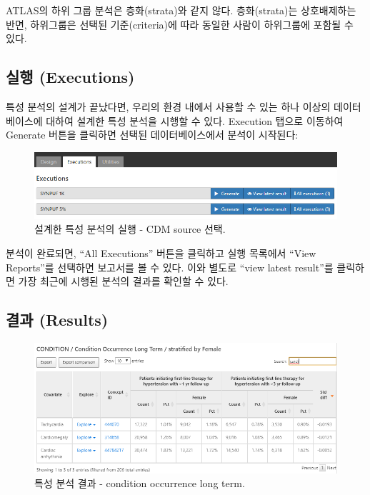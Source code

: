 \documentclass[11pt]{book}
\theoremstyle{definition}
\theoremstyle{definition}
\theoremstyle{definition}
\theoremstyle{remark}
\let\BeginKnitrBlock\begin \let\EndKnitrBlock\end
\begin{document}
\BeginKnitrBlock{rmdimportant}
ATLAS의 하위 그룹 분석은 층화(strata)와 같지 않다. 층화(strata)는
상호배제하는 반면, 하위그룹은 선택된 기준(criteria)에 따라 동일한 사람이
하위그룹에 포함될 수 있다.
\EndKnitrBlock{rmdimportant}

\subsection{실행 (Executions)}\label{-executions}

특성 분석의 설계가 끝났다면, 우리의 환경 내에서 사용할 수 있는 하나
이상의 데이터베이스에 대하여 설계한 특성 분석을 시행할 수 있다.
Execution 탭으로 이동하여 Generate 버튼을 클릭하면 선택된
데이터베이스에서 분석이 시작된다:

\begin{figure}

{\centering \includegraphics[width=1\linewidth]{images/Characterization/atlasCharacterizationExecutions} 

}

\caption{설계한 특성 분석의 실행 - CDM source 선택.}\label{fig:atlasCharacterizationExecutions}
\end{figure}

분석이 완료되면, ``All Executions'' 버튼을 클릭하고 실행 목록에서 ``View
Reports''를 선택하면 보고서를 볼 수 있다. 이와 별도로 ``view latest
result''를 클릭하면 가장 최근에 시행된 분석의 결과를 확인할 수 있다.

\subsection{결과 (Results)}\label{-results}

\begin{figure}

{\centering \includegraphics[width=1\linewidth]{images/Characterization/atlasCharacterizationResultsSummary} 

}

\caption{특성 분석 결과 - condition occurrence long term.}\label{fig:atlasCharacterizationResultsSummary}
\end{figure}
\end{document}
